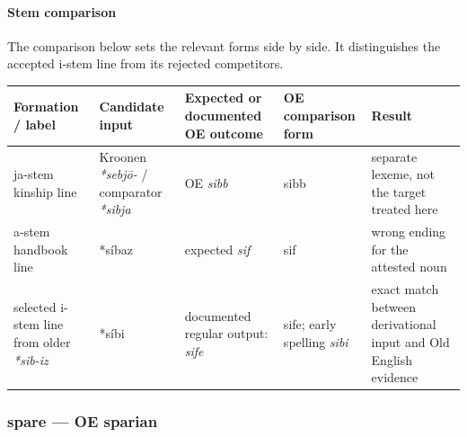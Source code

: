 \documentclass[
  british,
  a4paper,
]{article}
\newcounter{none} %
\begin{document}
\paragraph{Stem comparison}\label{stem-comparison-6}

The comparison below sets the relevant forms side by side. It
distinguishes the accepted i-stem line from its rejected competitors.

{\def\LTcaptype{none} %
\begin{longtable}[]{@{}
  >{\raggedright\arraybackslash}p{}
  >{\raggedright\arraybackslash}p{}
  >{\raggedright\arraybackslash}p{}
  >{\raggedright\arraybackslash}p{}
  >{\raggedright\arraybackslash}p{}@{}}
\toprule\noalign{}
\begin{minipage}[b]{\linewidth}\raggedright
Formation / label
\end{minipage} & \begin{minipage}[b]{\linewidth}\raggedright
Candidate input
\end{minipage} & \begin{minipage}[b]{\linewidth}\raggedright
Expected or documented OE outcome
\end{minipage} & \begin{minipage}[b]{\linewidth}\raggedright
OE comparison form
\end{minipage} & \begin{minipage}[b]{\linewidth}\raggedright
Result
\end{minipage} \\
\midrule\noalign{}
\endhead
\bottomrule\noalign{}
\endlastfoot
ja-stem kinship line & Kroonen \emph{*sebjō-} / comparator \emph{*sibja}
& OE \emph{sibb} & sibb & separate lexeme, not the target treated
here \\
a-stem handbook line & *síbaz & expected \emph{sif} & sif & wrong ending
for the attested noun \\
selected i-stem line from older \emph{*sib-iz} & *síbi & documented
regular output: \emph{sife} & sife; early spelling \emph{sibi} & exact
match between derivational input and Old English evidence \\
\end{longtable}
}

\subsubsection{spare --- OE sparian}\label{spare-oe-sparian}
\end{document}
